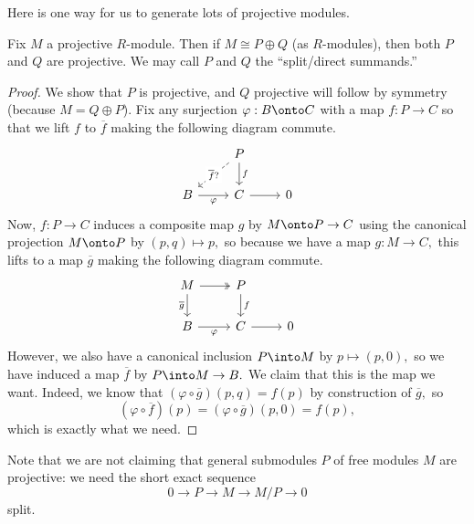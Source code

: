 Here is one way for us to generate lots of projective modules.
\begin{proposition} \label{prop:splitprojectivesum}
	Fix $M$ a projective $R$-module. Then if $M\cong P\oplus Q$ (as $R$-modules), then both $P$ and $Q$ are projective. We may call $P$ and $Q$ the ``split/direct summands.''
\end{proposition}
\begin{proof}
	We show that $P$ is projective, and $Q$ projective will follow by symmetry (because $M=Q\oplus P$). Fix any surjection $\varphi:B\onto C$ with a map $f:P\to C$ so that we lift $f$ to $\overline f$ making the following diagram commute.
	\[\begin{tikzcd}
		& P \\
		B & C & 0
		\arrow["\varphi"', from=2-1, to=2-2]
		\arrow[from=2-2, to=2-3]
		\arrow["f", from=1-2, to=2-2]
		\arrow["{\overline f}?"{description}, dashed, from=1-2, to=2-1]
	\end{tikzcd}\]
	Now, $f:P\to C$ induces a composite map $g$ by $M\onto P\to C$ using the canonical projection $M\onto P$ by $(p,q)\mapsto p,$ so because we have a map $g:M\to C,$ this lifts to a map $\overline g$ making the following diagram commute.
	\[\begin{tikzcd}
		M & P \\
		B & C & 0
		\arrow["\varphi"', from=2-1, to=2-2]
		\arrow[from=2-2, to=2-3]
		\arrow["f", from=1-2, to=2-2]
		\arrow[two heads, from=1-1, to=1-2]
		\arrow["{\overline g}"', from=1-1, to=2-1]
	\end{tikzcd}\]
	However, we also have a canonical inclusion $P\into M$ by $p\mapsto(p,0),$ so we have induced a map $\overline f$ by $P\into M\to B.$ We claim that this is the map we want. Indeed, we know that $(\varphi\circ\overline g)(p,q)=f(p)$ by construction of $\overline g,$ so
	\[(\varphi\circ\overline f)(p)=(\varphi\circ\overline g)(p,0)=f(p),\]
	which is exactly what we need.
\end{proof}
Note that we are not claiming that general submodules $P$ of free modules $M$ are projective: we need the short exact sequence
\[0\to P\to M\to M/P\to 0\]
split.

